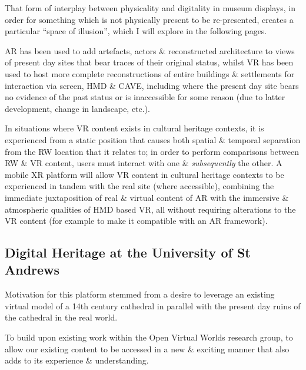 That form of interplay between physicality and digitality in museum displays, in order for something which is not physically present to be re-presented, creates a particular ``space of illusion'', which I will explore in the following pages.


AR has been used to add artefacts, actors \& reconstructed architecture to views of present day sites that bear traces of their original status, whilst VR has been used to host more complete reconstructions of entire buildings \& settlements for interaction via screen, HMD \& CAVE, including where the present day site bears no evidence of the past status or is inaccessible for some reason (due to latter development, change in landscape, etc.).

In situations where VR content exists in cultural heritage contexts, it is experienced from a static position that causes both spatial \& temporal separation from the RW location that it relates to; in order to perform comparisons between RW \& VR content, users must interact with one \& \textit{subsequently} the other. A mobile XR platform will allow VR content in cultural heritage contexts to be experienced in tandem with the real site (where accessible), combining the immediate juxtaposition of real \& virtual content of AR with the immersive \& atmospheric qualities of HMD based VR, all without requiring alterations to the VR content (for example to make it compatible with an AR framework).


\subsection{Digital Heritage at the University of St Andrews}

Motivation for this platform stemmed from a desire to leverage an existing virtual model of a 14th century cathedral in parallel with the present day ruins of the cathedral in the real world.

To build upon existing work within the Open Virtual Worlds research group, to allow our existing content to be accessed in a new \& exciting manner that also adds to its experience \& understanding.



